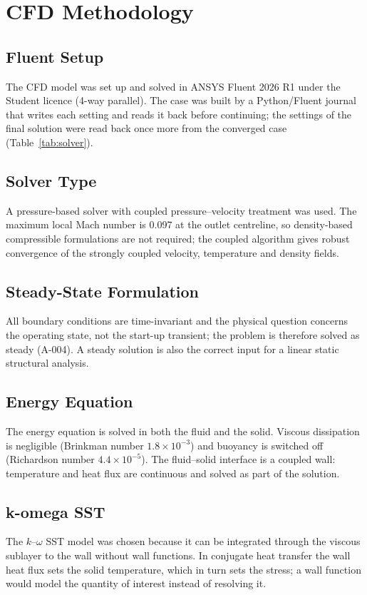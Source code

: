 \chapter{CFD Methodology}\label{ch:cfdmethod}

\section{Fluent Setup}
The CFD model was set up and solved in ANSYS Fluent 2026 R1 \cite{ansysfluent} under the Student licence (4-way parallel). The case was built by a Python/Fluent
journal that writes each setting and reads it back before continuing; the settings of the final solution were read back once more from the
converged case (Table~\ref{tab:solver}).



\section{Solver Type}
A pressure-based solver with coupled pressure--velocity treatment was used. The maximum local Mach number is 0.097 at the outlet
centreline, so density-based compressible formulations are not required; the coupled algorithm gives robust convergence of the strongly
coupled velocity, temperature and density fields.

\section{Steady-State Formulation}
All boundary conditions are time-invariant and the physical question concerns the operating state, not the start-up transient; the problem
is therefore solved as steady (A-004). A steady solution is also the correct input for a linear static structural analysis.

\section{Energy Equation}
The energy equation is solved in both the fluid and the solid. Viscous dissipation is negligible (Brinkman number $1.8\times10^{-3}$) and
buoyancy is switched off (Richardson number $4.4\times10^{-5}$). The fluid--solid interface is a coupled wall: temperature and heat flux are
continuous and solved as part of the solution.

\section{k-omega SST}
The $k$--$\omega$ SST model \cite{menter1994} was chosen because it can be integrated through the viscous sublayer to the wall without wall
functions. In conjugate heat transfer the wall heat flux sets the solid temperature, which in turn sets the stress; a wall function would
model the quantity of interest instead of resolving it.

